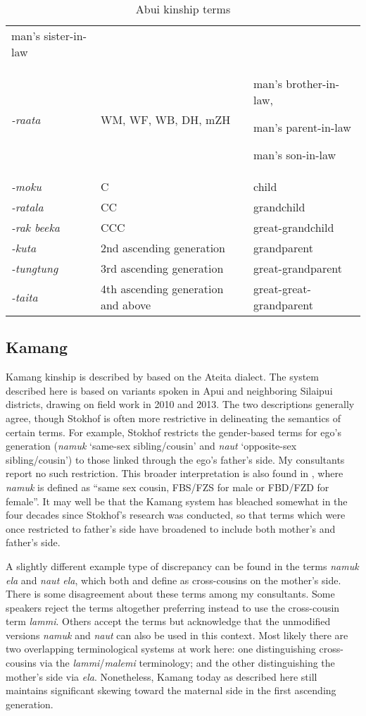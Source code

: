 \begin{table}
\begin{tabular}{p{3cm}p{3cm}p{5cm}}
man's sister-in-law\\
\textit{{}-raata} & WM, WF, WB, DH, mZH & man's brother-in-law,

man's parent-in-law

man's son-in-law\\
\textit{{}-moku} & C & child\\
\textit{{}-ratala} & CC & grandchild\\
\textit{{}-rak beeka} & CCC & great-grandchild\\
\textit{{}-kuta} & 2nd ascending generation & grandparent\\
\textit{{}-tungtung} & 3rd ascending generation & great-grandparent\\
\textit{{}-taita} & 4th ascending generation and above & great-great-grandparent\\
\end{tabular}

\caption{Abui kinship terms}
\end{table}

\subsection{Kamang}
Kamang kinship is described by \citet{Stokhof1977} based on the Ateita dialect. The system described here is based on variants spoken in Apui and neighboring Silaipui districts, drawing on field work in 2010 and 2013. The two descriptions generally agree, though Stokhof is often more restrictive in delineating the semantics of certain terms. For example, Stokhof restricts the gender-based terms for ego's generation (\textit{namuk} `same-sex sibling/cousin' and \textit{naut} `opposite-sex sibling/cousin') to those linked through the ego's father's side. My consultants report no such restriction. This broader interpretation is also found in \citet{SchapperEtAl2011}, where \textit{namuk} is defined as ``same sex cousin, FBS/FZS for male or FBD/FZD for female''. It may well be that the Kamang system has bleached somewhat in the four decades since Stokhof's research was conducted, so that terms which were once restricted to father's side have broadened to include both mother's and father's side.

A slightly different example type of discrepancy can be found in the terms \textit{namuk ela} and \textit{naut ela}, which both \citet{Stokhof1977} and   \citet{SchapperEtAl2011} define as cross-cousins on the mother's side. There is some disagreement about these terms among my consultants. Some speakers reject the terms altogether preferring instead to use the cross-cousin term \textit{lammi}. Others accept the terms but acknowledge that the unmodified versions \textit{namuk} and \textit{naut} can also be used in this context. Most likely there are two overlapping terminological systems at work here: one distinguishing cross-cousins via the \textit{lammi}/\textit{malemi} terminology; and the other distinguishing the mother's side via \textit{ela}. Nonetheless, Kamang today as described here still maintains significant skewing toward the maternal side in the first ascending generation.


